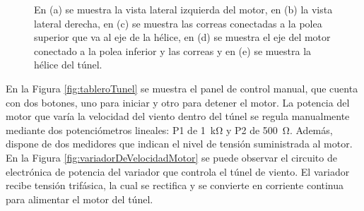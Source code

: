 \begin{figure}[H]
    \begin{minipage}{0.4\textwidth}
        \centering
    \end{minipage}
    \hspace{2em}
    \begin{minipage}{0.4\textwidth}
        \centering
    \end{minipage}
    \caption{En (a) se muestra la vista lateral izquierda del motor, en (b) la vista lateral derecha, en (c) se muestra las correas conectadas a la polea superior que va al eje de la hélice, en (d) se muestra el eje del motor conectado a la polea inferior y las correas y en (e) se muestra la hélice del túnel.}
    \label{fig:motorPolea}
\end{figure}

 En la Figura \ref{fig:tableroTunel} se muestra el panel de control manual, que cuenta con dos botones, uno para iniciar y otro para detener el motor. La potencia del motor que varía la velocidad del viento dentro del túnel se regula manualmente mediante dos potenciómetros lineales: P1 de \SI{1}{\kilo\ohm} y P2 de \SI{500}{\ohm}. Además, dispone de dos medidores que indican el nivel de tensión suministrada al motor. En la Figura \ref{fig:variadorDeVelocidadMotor} se puede observar el circuito de electrónica de potencia del variador que controla el túnel de viento. El variador recibe tensión trifásica, la cual se rectifica y se convierte en corriente continua para alimentar el motor del túnel.

